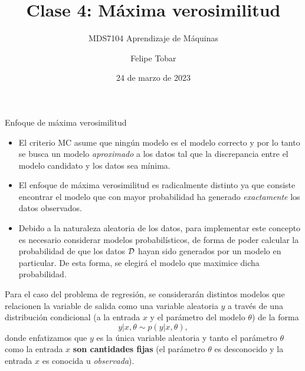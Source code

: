 \documentclass[handout, 9pt]{beamer}
\title{Clase 4: Máxima verosimilitud}
\subtitle{MDS7104 Aprendizaje de Máquinas}
\date{24 de marzo de 2023}
\author{Felipe Tobar}
\institute{Iniciativa de Datos e Inteligencia Artificial\\Universidad de Chile}
\begin{document}
\begin{frame}
  \titlepage
\end{frame}

\begin{frame}{Enfoque de máxima verosimilitud}

\begin{itemize}
	\item El criterio MC asume que ningún modelo es el modelo correcto y por lo tanto se busca un modelo \emph{aproximado} a los datos tal que la discrepancia entre el modelo candidato y los datos sea mínima.\pause
	\item El enfoque de máxima verosimilitud es radicalmente distinto ya que consiste encontrar el modelo que con mayor probabilidad ha generado \emph{exactamente} los datos observados.\pause
	\item Debido a la naturaleza aleatoria de los datos, para implementar este concepto es necesario considerar modelos probabilísticos, de forma de poder calcular la probabilidad de que los datos ${\mathcal D}$ hayan sido generados por un modelo en particular. De esta forma, se elegirá el modelo que maximice dicha probabilidad.\pause
\end{itemize}
	
Para el caso del problema de regresión, se considerarán distintos modelos que relacionen la variable de salida como una variable aleatoria $y$ a través de una distribución condicional (a la entrada $x$ y el parámetro del modelo $\theta$) de la forma 
\begin{equation*}
	y|x,\theta \sim p(y|x,\theta),\label{eq:mod_gen}
\end{equation*}
donde enfatizamos que $y$ es  la única variable aleatoria y tanto el parámetro $\theta$ como la entrada $x$ \textbf{son cantidades fijas} (el parámetro $\theta$ es desconocido y la entrada $x$ es conocida u \emph{observada}).
	
\end{frame}
\end{document}
